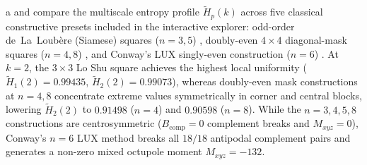 a and  compare the multiscale entropy profile $\widetilde{H}_p(k)$ across five classical constructive presets included in the interactive explorer: odd-order de~La~Loub\`ere (Siamese) squares ($n=3,5$) \cite{loubere1693}, doubly-even $4\times 4$ diagonal-mask squares ($n=4,8$) \cite{andrews1960magic}, and Conway's LUX singly-even construction ($n=6$) \cite{berlekamp2004winning}. At $k=2$, the $3\times 3$ Lo Shu square achieves the highest local uniformity ($\widetilde{H}_1(2) = 0.99435$, $\widetilde{H}_2(2) = 0.99073$), whereas doubly-even mask constructions at $n=4,8$ concentrate extreme values symmetrically in corner and central blocks, lowering $\widetilde{H}_2(2)$ to $0.91498$ ($n=4$) and $0.90598$ ($n=8$). While the $n=3,4,5,8$ constructions are centrosymmetric ($B_{\mathrm{comp}}=0$ complement breaks and $M_{xyz}=0$), Conway's $n=6$ LUX method breaks all $18/18$ antipodal complement pairs and generates a non-zero mixed octupole moment $M_{xyz} = -132$.

\begin{table}[t]
\centering
\caption{\textbf{Multiscale window entropy $\widetilde{H}_p(2)$, interior and toroidal $2\times 2$ quartet energies $W_{2\times 2}$, complement breaks $B_{\mathrm{comp}}$, and mixed octupole moment $M_{xyz}$ across constructive magic square families ($n=3\dots 8$).}}
\label{tab:constructive_families}
\end{table}

